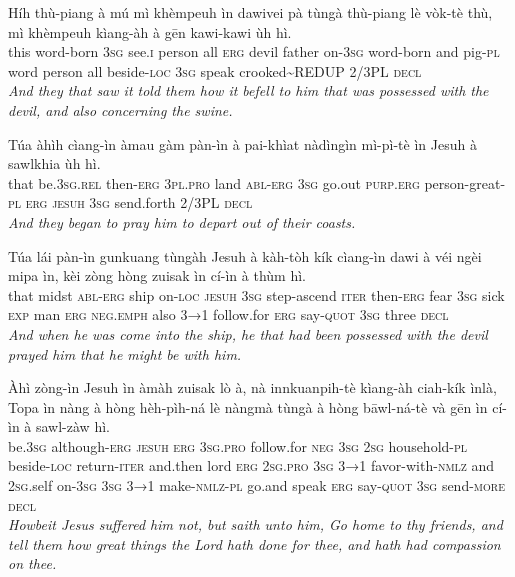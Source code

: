 \documentclass[11pt,a4paper]{article}
\begin{document}
\begin{exe}
\gll Híh thù-piang à mú mì khèmpeuh ìn dawivei pà tùngà thù-piang lè vòk-tè thù, mì khèmpeuh kìang-àh à gēn kawi-kawi ùh hì. \\
     this word-born \textsc{3sg} see.\textsc{i} person all \textsc{erg} devil father on-\textsc{3sg} word-born and pig-\textsc{pl} word person all beside-\textsc{loc} \textsc{3sg} speak crooked\textasciitilde{}REDUP 2/3PL \textsc{decl} \\
\glt \textcolor{kjvcolor}{\textit{And they that saw it told them how it befell to him that was possessed with the devil, and also concerning the swine.}}

\gll Túa àhìh cìang-ìn àmau gàm pàn-ìn à pai-khìat nàdìngìn mì-pì-tè ìn Jesuh à sawlkhia ùh hì. \\
     that be.\textsc{3sg}.\textsc{rel} then-\textsc{erg} \textsc{3pl}.\textsc{pro} land \textsc{abl}-\textsc{erg} \textsc{3sg} go.out \textsc{purp}.\textsc{erg} person-great-\textsc{pl} \textsc{erg} \textsc{jesuh} \textsc{3sg} send.forth 2/3PL \textsc{decl} \\
\glt \textcolor{kjvcolor}{\textit{And they began to pray him to depart out of their coasts.}}

\gll Túa lái pàn-ìn gunkuang tùngàh Jesuh à kàh-tòh kík cìang-ìn dawi à véi ngèi mipa ìn, kèi zòng hòng zuisak ìn cí-ìn à thùm hì. \\
     that midst \textsc{abl}-\textsc{erg} ship on-\textsc{loc} \textsc{jesuh} \textsc{3sg} step-ascend \textsc{iter} then-\textsc{erg} fear \textsc{3sg} sick \textsc{exp} man \textsc{erg} \textsc{neg}.\textsc{emph} also \textsc{3→1} follow.for \textsc{erg} say-\textsc{quot} \textsc{3sg} three \textsc{decl} \\
\glt \textcolor{kjvcolor}{\textit{And when he was come into the ship, he that had been possessed with the devil prayed him that he might be with him.}}

\gll Àhì zòng-ìn Jesuh ìn àmàh zuisak lò à, nà innkuanpih-tè kìang-àh ciah-kík ìnlà, Topa ìn nàng à hòng hèh-pìh-ná lè nàngmà tùngà à hòng bāwl-ná-tè và gēn ìn cí-ìn à sawl-zàw hì. \\
     be.\textsc{3sg} although-\textsc{erg} \textsc{jesuh} \textsc{erg} \textsc{3sg}.\textsc{pro} follow.for \textsc{neg} \textsc{3sg} \textsc{2sg} household-\textsc{pl} beside-\textsc{loc} return-\textsc{iter} and.then lord \textsc{erg} \textsc{2sg}.\textsc{pro} \textsc{3sg} \textsc{3→1} favor-with-\textsc{nmlz} and \textsc{2sg}.self on-\textsc{3sg} \textsc{3sg} \textsc{3→1} make-\textsc{nmlz}-\textsc{pl} go.and speak \textsc{erg} say-\textsc{quot} \textsc{3sg} send-\textsc{more} \textsc{decl} \\
\glt \textcolor{kjvcolor}{\textit{Howbeit Jesus suffered him not, but saith unto him, Go home to thy friends, and tell them how great things the Lord hath done for thee, and hath had compassion on thee.}}


\end{exe}
\end{document}
